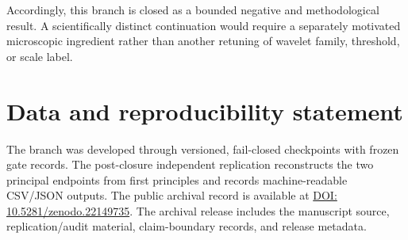 \documentclass[11pt,a4paper]{article}
\begin{document}
Accordingly, this branch is closed as a bounded negative and methodological result. A scientifically distinct continuation would require a separately motivated microscopic ingredient rather than another retuning of wavelet family, threshold, or scale label.

\section*{Data and reproducibility statement}
The branch was developed through versioned, fail-closed checkpoints with frozen gate records. The post-closure independent replication reconstructs the two principal endpoints from first principles and records machine-readable CSV/JSON outputs. The public archival record is available at \href{https://doi.org/10.5281/zenodo.22149735}{DOI: 10.5281/zenodo.22149735}. The archival release includes the manuscript source, replication/audit material, claim-boundary records, and release metadata.
\end{document}
